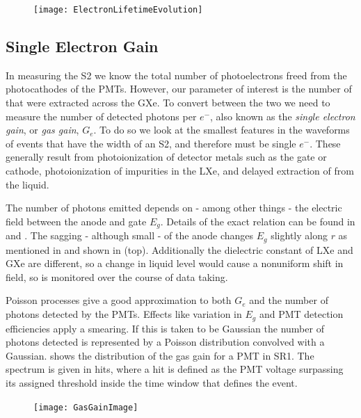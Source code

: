 {\begin{figure}
\centering
\texttt{[image: ElectronLifetimeEvolution]}
\label{fig:det_char_elifetime_evolution}
\end{figure}



\subsection{Single Electron Gain}
\label{subsec:det_char_single_electron_gain}
In measuring the S2 we know the total number of photoelectrons freed from the photocathodes of the PMTs.  However, our parameter of
interest is the number of \electron that were extracted across the GXe.  To convert between the two we need to measure the number of
detected photons per $e^-$, also known as the \textit{single electron gain}, or \textit{gas gain}, $G_e$.  To do so we look at the
smallest features in the waveforms of events that have the width of an S2, and therefore must be single $e^-$.  These generally result
from photoionization of detector metals such as the gate or cathode, photoionization of impurities in the LXe, and delayed extraction
of \electron from the liquid.

The number of photons emitted depends on - among other things - the electric field between the anode and gate $E_g$.  Details of the
exact relation can be found in  and .  The sagging - although small - of the
anode changes $E_g$ slightly along $r$ as mentioned in  and shown in
 (top).  Additionally the dielectric constant of LXe and GXe are different, so a change in liquid level
would cause a nonuniform shift in field, so is monitored over the course of data taking.

Poisson processes give a good approximation to both $G_e$ and the number of photons detected by the PMTs.  Effects like variation in $E_g$
and PMT detection efficiencies apply a smearing.  If this is taken to be Gaussian the number of photons detected is represented by a
Poisson distribution convolved with a Gaussian.   shows the distribution of
the gas gain for a PMT in SR1.  The spectrum is given in hits, where a hit is defined as the PMT voltage surpassing its assigned threshold
inside the time window that defines the event.

\begin{figure}
\centering
\texttt{[image: GasGainImage]}
\label{fig:calibrations_single_electron_gain_num_photons}
\end{figure}



}
